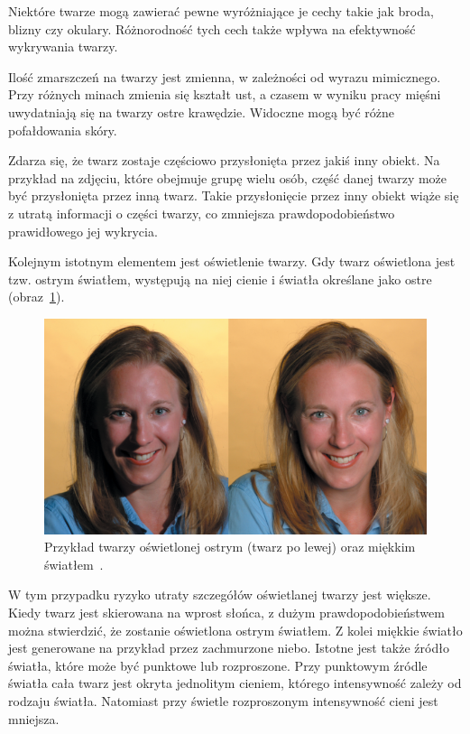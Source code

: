 \documentclass[a4paper,twoside,12pt]{book}
\begin{document}
    Niektóre twarze mogą zawierać pewne wyróżniające je cechy takie jak broda, blizny czy okulary.
    Różnorodność tych cech także wpływa na efektywność wykrywania twarzy.

    Ilość zmarszczeń na twarzy jest zmienna, w zależności od wyrazu mimicznego.
    Przy różnych minach zmienia się kształt ust, a czasem w wyniku pracy mięśni uwydatniają się na twarzy ostre
    krawędzie.
    Widoczne mogą być różne pofałdowania skóry.

    Zdarza się, że twarz zostaje częściowo przysłonięta przez jakiś inny obiekt.
    Na przykład na zdjęciu,
    które obejmuje grupę wielu osób, część danej twarzy może być przysłonięta przez inną twarz.
    Takie przysłonięcie przez inny obiekt wiąże się z utratą informacji o części twarzy, co zmniejsza prawdopodobieństwo
    prawidłowego jej wykrycia.

    Kolejnym istotnym elementem jest oświetlenie twarzy.
    Gdy twarz oświetlona jest tzw. ostrym światłem, występują na
    niej cienie i światła określane jako ostre (obraz~\ref{fig.oswietlenieTwarzy}).
    \begin{figure}[h!]
        \centering
        \includegraphics[width=12cm]{Obrazy/oswietlenieTwarzy.jpg}
        \caption{Przykład twarzy oświetlonej ostrym (twarz po lewej) oraz miękkim światłem~\cite{oswietlenieTwarzy}.}
        \label{fig.oswietlenieTwarzy}
    \end{figure}
    W tym przypadku ryzyko utraty szczegółów oświetlanej twarzy jest większe.
    Kiedy twarz jest skierowana na wprost słońca, z dużym
    prawdopodobieństwem można stwierdzić, że zostanie oświetlona ostrym światłem.
    Z kolei miękkie światło jest generowane na przykład przez zachmurzone niebo.
    Istotne jest także źródło światła, które
    może być punktowe lub rozproszone.
    Przy punktowym źródle światła cała twarz jest
    okryta jednolitym cieniem, którego intensywność zależy od rodzaju światła.
    Natomiast przy świetle rozproszonym intensywność cieni jest mniejsza.
\end{document}
